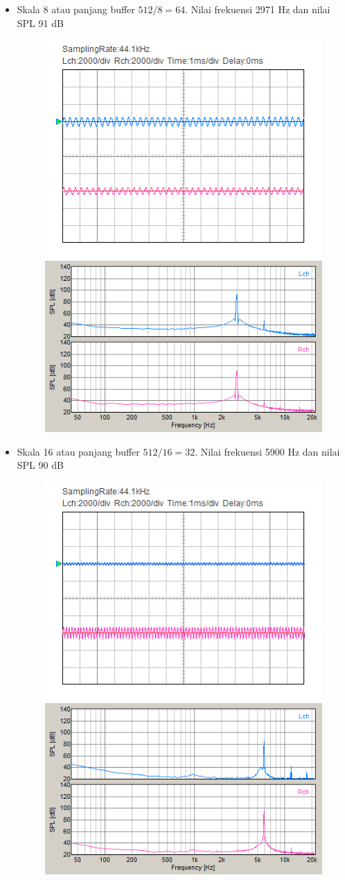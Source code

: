 \documentclass[12pt,]{article}
\begin{document}
\begin{itemize}
  		\item Skala 8 atau panjang buffer $512/8 = 64$.
  		Nilai frekuensi 2971 Hz dan nilai SPL 91 dB
  		\begin{figure}[H]
  			\centering
  			\includegraphics[width=0.45\linewidth]{result/day_4/osi_sine8}
  			\includegraphics[width=0.45\linewidth]{result/day_4/fft_sine8}
  		\end{figure}
  	
  		\newpage
  		\item Skala 16 atau panjang buffer $512/16 = 32$.
  		Nilai frekuensi 5900 Hz dan nilai SPL 90 dB
  		\begin{figure}[H]
  			\centering
  			\includegraphics[width=0.45\linewidth]{result/day_4/osi_sine16}
  			\includegraphics[width=0.45\linewidth]{result/day_4/fft_sine16}
  		\end{figure}
  	

\end{itemize}
\end{document}
